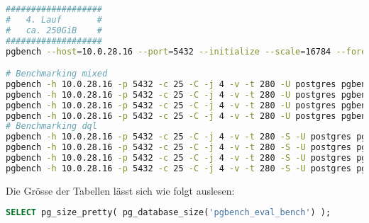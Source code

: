 \begin{flushleft}
\begin{lstlisting}[language=bash, caption=Patroni - Benchmarking-Commands,captionpos=b,label={lst:patroni-benchmarking-commands},breaklines=true]
###################
#   4. Lauf       #
#   ca. 250GiB    #
###################
pgbench --host=10.0.28.16 --port=5432 --initialize --scale=16784 --foreign-keys --fillfactor=100 --username=dtgvpf --index-tablespace=eval_index_tablespace --tablespace=eval_data_tablespace --username=postgres pgbench_eval_bench

# Benchmarking mixed
pgbench -h 10.0.28.16 -p 5432 -c 25 -C -j 4 -v -t 280 -U postgres pgbench_eval_bench > /home/itgramic/4_1_patroni_mixed_benchmark.txt
pgbench -h 10.0.28.16 -p 5432 -c 25 -C -j 4 -v -t 280 -U postgres pgbench_eval_bench > /home/itgramic/4_2_patroni_mixed_benchmark.txt
pgbench -h 10.0.28.16 -p 5432 -c 25 -C -j 4 -v -t 280 -U postgres pgbench_eval_bench > /home/itgramic/4_3_patroni_mixed_benchmark.txt
pgbench -h 10.0.28.16 -p 5432 -c 25 -C -j 4 -v -t 280 -U postgres pgbench_eval_bench > /home/itgramic/4_4_patroni_mixed_benchmark.txt
# Benchmarking dql
pgbench -h 10.0.28.16 -p 5432 -c 25 -C -j 4 -v -t 280 -S -U postgres pgbench_eval_bench > /home/itgramic/4_1_patroni_dql_benchmark.txt
pgbench -h 10.0.28.16 -p 5432 -c 25 -C -j 4 -v -t 280 -S -U postgres pgbench_eval_bench > /home/itgramic/4_2_patroni_dql_benchmark.txt
pgbench -h 10.0.28.16 -p 5432 -c 25 -C -j 4 -v -t 280 -S -U postgres pgbench_eval_bench > /home/itgramic/4_3_patroni_dql_benchmark.txt
pgbench -h 10.0.28.16 -p 5432 -c 25 -C -j 4 -v -t 280 -S -U postgres pgbench_eval_bench > /home/itgramic/4_4_patroni_dql_benchmark.txt
\end{lstlisting}
\end{flushleft}
\begin{flushleft}
    Die Grösse der Tabellen lässt sich wie folgt auslesen:
\lstset{style=gra_codestyle}
\begin{lstlisting}[language=sql, caption=Patroni - Benchmarking - Table Size SQL,captionpos=b,label={lst:patroni-benchmarking-table-size-sql},breaklines=true]
SELECT pg_size_pretty( pg_database_size('pgbench_eval_bench') );
\end{lstlisting}
\end{flushleft}